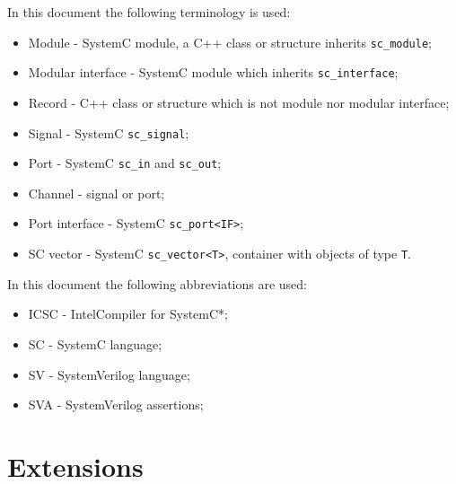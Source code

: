 In this document the following terminology is used:
%
\begin{itemize}
\item Module - SystemC module, a C++ class or structure inherits {\tt sc\_module};
\item Modular interface - SystemC module which inherits {\tt sc\_interface};
\item Record - C++ class or structure which is not module nor modular interface;
\item Signal - SystemC {\tt sc\_signal};
\item Port - SystemC {\tt sc\_in} and {\tt sc\_out};
\item Channel - signal or port;
\item Port interface - SystemC {\tt sc\_port<IF>};
\item SC vector - SystemC {\tt sc\_vector<T>}, container with objects of type {\tt T}.
\end{itemize}
%
In this document the following abbreviations are used:
%
\begin{itemize}
\item ICSC - Intel\textregistered Compiler for SystemC*;
\item SC - SystemC language;
\item SV - SystemVerilog language;
\item SVA - SystemVerilog assertions;
\end{itemize}




\ifdefined\INTEL

\else

\fi










\section{Extensions}\label{section:extensions}

\ifdefined\INTEL
 
\fi



%



